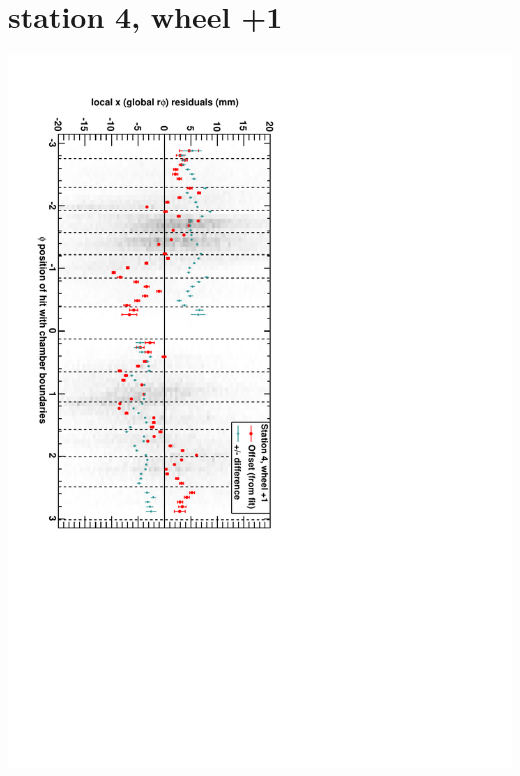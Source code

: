 \documentclass[compress]{beamer}
\begin{document}
\section*{station 4, wheel +1}
\begin{frame} \vfill \mbox{\hspace{-1 cm}\includegraphics[height=1.2\linewidth, angle=90]{DTrphiVsPhi_st4_whD.pdf}} \end{frame}
\end{document}
